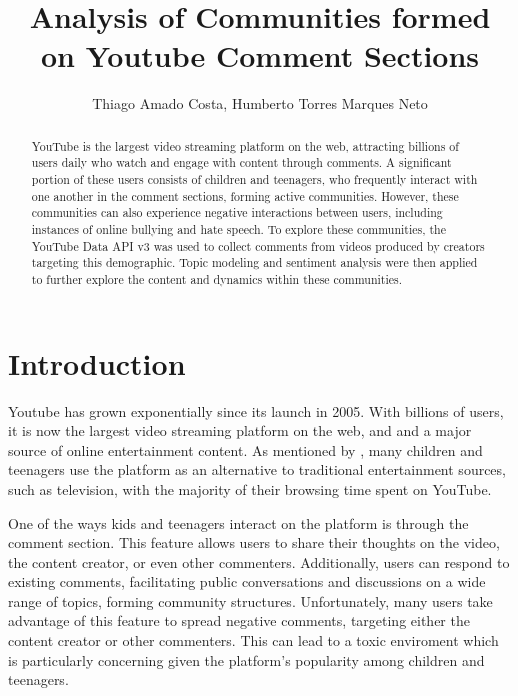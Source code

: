 \documentclass[12pt]{article}
\title{Analysis of Communities formed on Youtube Comment Sections}
\author{Thiago Amado Costa\inst{1}, Humberto Torres Marques Neto\inst{1}}
\begin{document}
\maketitle

\begin{abstract}
    YouTube is the largest video streaming platform on the web, attracting billions of users 
    daily who watch and engage with content through comments. 
    A significant portion of these users consists of children and teenagers, who frequently interact 
    with one another in the comment sections, forming active communities. 
    However, these communities can also experience negative interactions between users, 
    including instances of online bullying and hate speech.
    To explore these communities, the YouTube Data API v3 was used to collect comments 
    from videos produced by creators targeting this demographic. 
    Topic modeling and sentiment analysis were then applied to further explore the 
    content and dynamics within these communities.
\end{abstract}

\section{Introduction}


Youtube has grown exponentially since its launch in 2005. With billions of users, it is now the 
largest video streaming platform on the web, and and a major source of online entertainment content. 
As mentioned by \cite{app13064044}, many children and teenagers use the platform as an alternative to 
traditional entertainment sources, such as television, with the majority of their 
browsing time spent on YouTube.

One of the ways kids and teenagers interact on the platform is through the comment section. 
This feature allows users to share their thoughts on the video, the content creator, 
or even other commenters. Additionally, users can respond to existing comments, 
facilitating public conversations and discussions on a wide range of topics, forming community structures. 
Unfortunately, many users take advantage of this feature to spread negative comments, targeting 
either the content creator or other commenters. 
This can lead to a toxic enviroment which is particularly concerning given the platform's 
popularity among children and teenagers.
\end{document}
